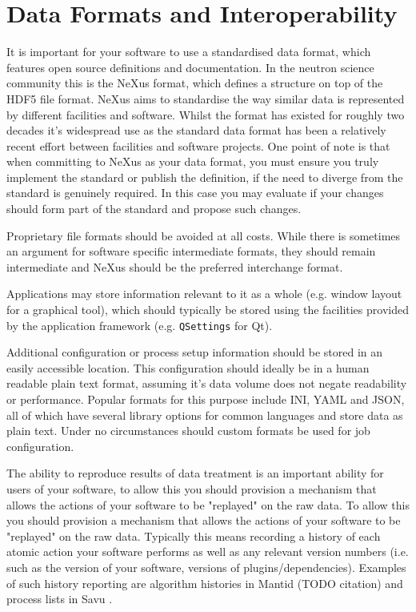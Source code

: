 \documentclass[jnr]{iosart2x}
\begin{document}
\section{Data Formats and Interoperability}
\label{Data Formats and Interoperability}

It is important for your software to use a standardised data format, which features open source definitions and documentation.
In the neutron science community this is the NeXus format, which defines a structure on top of the HDF5 file format.
NeXus aims to standardise the way similar data is represented by different facilities and software.
Whilst the format has existed for roughly two decades it's widespread use as the standard data format has been a relatively recent effort between facilities and software projects.
One point of note is that when committing to NeXus as your data format, you must ensure you truly implement the standard or publish the definition, if the need to diverge from the standard is genuinely required.
In this case you may evaluate if your changes should form part of the standard and propose such changes.

Proprietary file formats should be avoided at all costs.
While there is sometimes an argument for software specific intermediate formats, they should remain intermediate and NeXus should be the preferred interchange format.

Applications may store information relevant to it as a whole (e.g. window layout for a graphical tool), which should typically be stored using the facilities provided by the application framework (e.g. \texttt{QSettings} for Qt).

Additional configuration or process setup information should be stored in an easily accessible location.
This configuration should ideally be in a human readable plain text format, assuming it's data volume does not negate readability or performance.
Popular formats for this purpose include INI, YAML and JSON, all of which have several library options for common languages and store data as plain text.
Under no circumstances should custom formats be used for job configuration.

The ability to reproduce results of data treatment is an important ability for users of your software, to allow this you should provision a mechanism that allows the actions of your software to be "replayed" on the raw data.
To allow this you should provision a mechanism that allows the actions of your software to be "replayed" on the raw data.
Typically this means recording a history of each atomic action your software performs as well as any relevant version numbers (i.e. such as the version of your software, versions of plugins/dependencies).
Examples of such history reporting are algorithm histories in Mantid (TODO citation) and process lists in Savu \cite{Wadeson_2016}.
\end{document}
